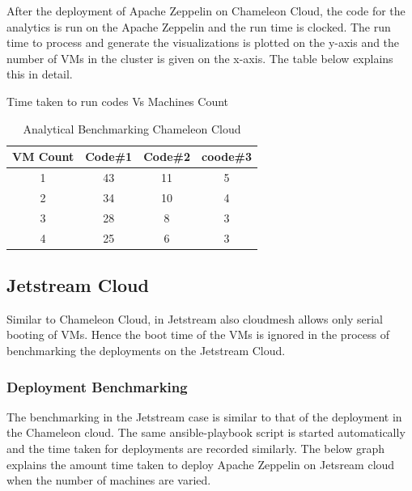 \documentclass[9pt,twocolumn,twoside]{../../styles/osajnl}
\begin{document}
After the deployment of Apache Zeppelin on Chameleon Cloud, the code 
for the analytics is run on the Apache Zeppelin and the run time is 
clocked. The run time to process and generate the visualizations is 
plotted on the y-axis and the number of VMs in the cluster is given 
on the x-axis. The table below explains this in detail.

\begin{table}[ht]
	\caption{Analytical Benchmarking Chameleon Cloud} %
	\centering %
	Time taken to run codes Vs Machines Count \\
	\begin{tabular}{c c c c} %
		\hline
		\hline %
		VM Count & Code\#1 & Code\#2 & coode\#3 \\ [0.5ex] %
		\hline %
		1 & 43 & 11 & 5 \\ %
		2 & 34 & 10 & 4 \\
		3 & 28 & 8 & 3 \\
		4 & 25 & 6 & 3 \\ [1ex] %
		\hline %
	\end{tabular}
	\label{table:nonlin} %
\end{table}


\subsection{Jetstream Cloud}

Similar to Chameleon Cloud, in Jetstream also cloudmesh allows only 
serial booting of VMs. Hence the boot time of the VMs is ignored in 
the process of benchmarking the deployments on the Jetstream Cloud.


\subsubsection{Deployment Benchmarking}

The benchmarking in the Jetstream case is similar to that of the 
deployment in the Chameleon cloud. The same ansible-playbook script 
is started automatically and the time taken for deployments are 
recorded similarly. The below graph explains the amount time taken to 
deploy Apache Zeppelin on Jetsream cloud when the number of machines 
are varied.
\end{document}
